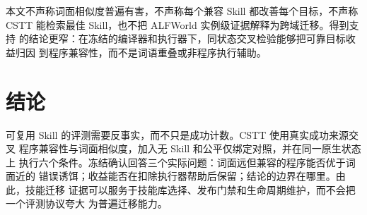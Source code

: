 \documentclass[10pt]{article}
\begin{document}
本文不声称词面相似度普遍有害，不声称每个兼容 Skill 都改善每个目标，不声称
CSTT 能检索最佳 Skill，也不把 ALFWorld 实例级证据解释为跨域迁移。得到支持
的结论更窄：在冻结的编译器和执行器下，同状态交叉检验能够把可靠目标收益归因
到程序兼容性，而不是词语重叠或非程序执行辅助。

\section{结论}
可复用 Skill 的评测需要反事实，而不只是成功计数。CSTT 使用真实成功来源交叉
程序兼容性与词面相似度，加入无 Skill 和公平仅绑定对照，并在同一原生状态上
执行六个条件。冻结确认回答三个实际问题：词面远但兼容的程序能否优于词面近的
错误诱饵；收益能否在扣除执行器帮助后保留；结论的边界在哪里。由此，技能迁移
证据可以服务于技能库选择、发布门禁和生命周期维护，而不会把一个评测协议夸大
为普遍迁移能力。



\end{document}
